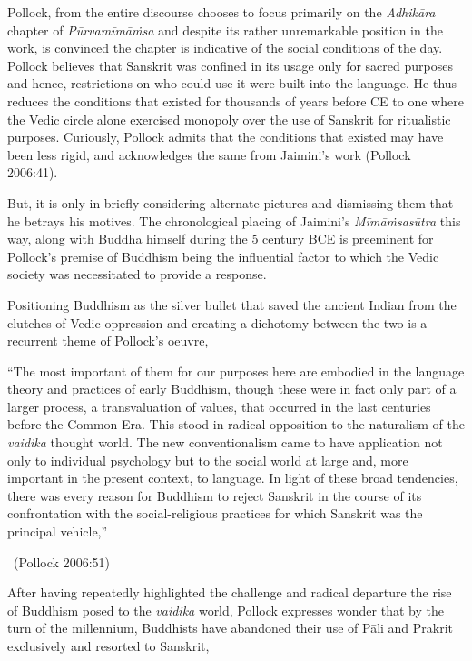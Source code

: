 Pollock, from the entire discourse chooses to focus primarily on the \textit{Adhikāra} chapter of \textit{Pūrvamīmāṁsa} and despite its rather unremarkable position in the work, is convinced the chapter is indicative of the social conditions of the day. Pollock believes that Sanskrit was confined in its usage only for sacred purposes and hence, restrictions on who could use it were built into the language. He thus reduces the conditions that existed for thousands of years before CE to one where the Vedic circle alone exercised monopoly over the use of Sanskrit for ritualistic purposes. Curiously, Pollock admits that the conditions that existed may have been less rigid, and acknowledges the same from Jaimini’s work (Pollock 2006:41).

But, it is only in briefly considering alternate pictures and dismissing them that he betrays his motives. The chronological placing of Jaimini’s \textit{Mīmāṁsasūtra} this way, along with Buddha himself during the 5 century BCE is preeminent for Pollock’s premise of Buddhism being the influential factor to which the Vedic society was necessitated to provide a response.

Positioning Buddhism as the silver bullet that saved the ancient Indian from the clutches of Vedic oppression and creating a dichotomy between the two is a recurrent theme of Pollock’s oeuvre,

\begin{myquote}
“The most important of them for our purposes here are embodied in the language theory and practices of early Buddhism, though these were in fact only part of a larger process, a transvaluation of values, that occurred in the last centuries before the Common Era. This stood in radical opposition to the naturalism of the \textit{vaidika} thought world. The new conventionalism came to have application not only to individual psychology but to the social world at large and, more important in the present context, to language. In light of these broad tendencies, there was every reason for Buddhism to reject Sanskrit in the course of its confrontation with the social-religious practices for which Sanskrit was the principal vehicle,” 

~\hfill (Pollock 2006:51)
\end{myquote}

After having repeatedly highlighted the challenge and radical departure the rise of Buddhism posed to the \textit{vaidika} world, Pollock expresses wonder that by the turn of the millennium, Buddhists have abandoned their use of Pāli and Prakrit exclusively and resorted to Sanskrit,

